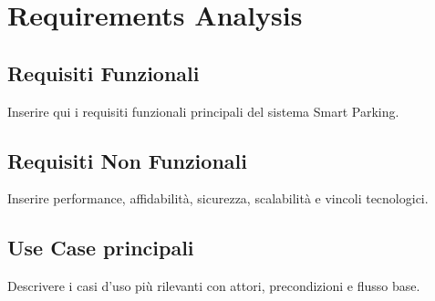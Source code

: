 \chapter{Requirements Analysis}

\section{Requisiti Funzionali}
Inserire qui i requisiti funzionali principali del sistema Smart Parking.

\section{Requisiti Non Funzionali}
Inserire performance, affidabilità, sicurezza, scalabilità e vincoli tecnologici.

\section{Use Case principali}
Descrivere i casi d'uso più rilevanti con attori, precondizioni e flusso base.
